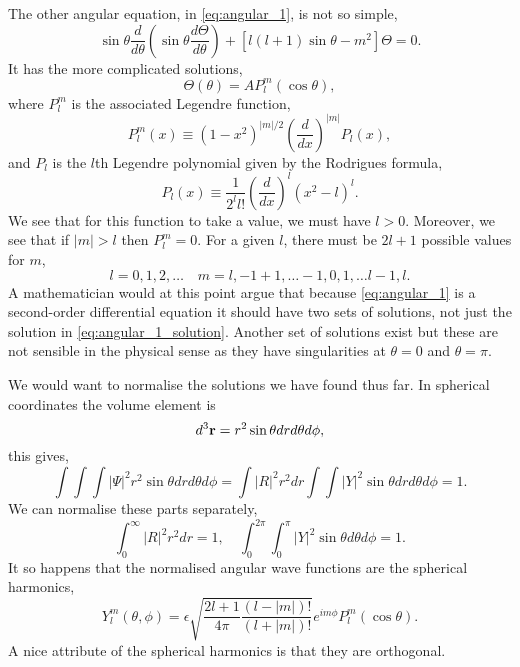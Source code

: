 The other angular equation, in \autoref{eq:angular_1}, is not so simple,
\begin{equation}
    \sin\theta\frac{d}{d\theta}\left(\sin\theta\frac{d\Theta}{d\theta} \right)
    + \left[l(l + 1)\sin\theta - m^2 \right]\Theta = 0.
\end{equation}
It has the more complicated solutions,
\begin{equation}
    \label{eq:angular_1_solution}
    \Theta(\theta) = A P^m_l(\cos\theta),
\end{equation}
where $P^m_l$ is the associated Legendre function,
\begin{equation}
    P^m_l(x) \equiv (1-x^2)^{|m|/2} \left(\frac{d}{dx}\right)^{|m|}P_l(x),
\end{equation}
and $P_l$ is the $l$th Legendre polynomial given by the Rodrigues formula,
\begin{equation}
    P_l(x) \equiv \frac{1}{2^l l!}\left(\frac{d}{dx} \right)^l(x^2 - l)^l.
\end{equation}
We see that for this function to take a value, we must have $l > 0$. Moreover, 
we see that if $|m| > l$ then $P^m_l = 0$. For a given $l$, there must be 
$2l + 1$ possible values for $m$,
\begin{equation*}
    l = 0, 1, 2, \dots \quad m = l, -1 + 1, \dots - 1, 0, 1, \dots l-1, l.
\end{equation*}
A mathematician would at this point argue that because \autoref{eq:angular_1} is 
a second-order differential equation it should have two sets of solutions, not 
just the solution in \autoref{eq:angular_1_solution}. Another set of solutions 
exist but these are not sensible in the physical sense as they have singularities 
at $\theta=0$ and $\theta=\pi$.

We would want to normalise the solutions we have found thus far. In spherical 
coordinates the volume element is 
\begin{equation}
    d^3\vb{r} = r^2 \sin\theta dr d\theta d\phi,
\end{equation}
this gives,
\begin{equation}
    \int\int\int |\Psi|^2 r^2\sin\theta dr d\theta d\phi
    = \int |R|^2r^2 dr \int\int|Y|^2\sin\theta dr d\theta d\phi = 1.
\end{equation}
We can normalise these parts separately,
\begin{equation}
    \int_0^\infty |R|^2 r^2 dr = 1, \quad 
    \int_0^{2\pi}\int_0^\pi |Y|^2 \sin\theta d\theta d\phi = 1.
\end{equation}
It so happens that the normalised angular wave functions are the 
spherical harmonics,
\begin{equation}
    \label{eq:spherical_harmonics_app}
    Y^m_l(\theta, \phi) 
    =
    \epsilon\sqrt{\frac{2l + 1}{4\pi}\frac{(l - |m|)!}{(l + |m|)!}}
    e^{im\phi} P^m_l(\cos\theta).
\end{equation}
A nice attribute of the spherical harmonics is that they are orthogonal.

